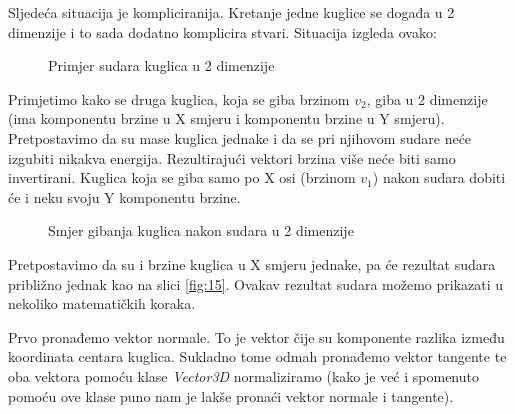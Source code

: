 Sljedeća situacija je kompliciranija. Kretanje jedne kuglice se događa u 2 dimenzije i to sada dodatno komplicira stvari. Situacija izgleda ovako:
\begin{figure}[!http]
	\begin{center}
	\end{center}
	\caption {Primjer sudara kuglica u 2 dimenzije}
	\label{fig:16}
\end{figure}
Primjetimo kako se druga kuglica, koja se giba brzinom $v_{2}$, giba u 2 dimenzije (ima komponentu brzine u X smjeru i komponentu brzine u Y smjeru). Pretpostavimo da su mase kuglica jednake i da se pri njihovom sudare neće izgubiti nikakva energija. Rezultirajući vektori brzina više neće biti samo invertirani. Kuglica koja se giba samo po X osi (brzinom $v_{1}$) nakon sudara dobiti će i neku svoju Y komponentu brzine.
\begin{figure}[!http]
	\begin{center}
	\end{center}
	\caption {Smjer gibanja kuglica nakon sudara u 2 dimenzije}
	\label{fig:17}
\end{figure}
Pretpostavimo da su i brzine kuglica u X smjeru jednake, pa će rezultat sudara približno jednak kao na slici \ref{fig:15}. Ovakav rezultat sudara možemo prikazati u nekoliko matematičkih koraka\cite{2}.

Prvo pronađemo vektor normale. To je vektor čije su komponente razlika između koordinata centara kuglica. Sukladno tome odmah pronađemo vektor tangente te oba vektora pomoću klase \emph{Vector3D} normaliziramo (kako je već i spomenuto pomoću ove klase puno nam je lakše pronaći vektor normale i tangente)\cite{2}.

